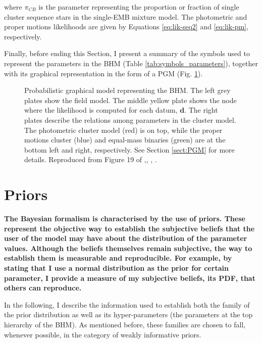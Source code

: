 where $\pi_{CB}$ is the parameter representing the proportion or fraction of single cluster sequence stars in the single-EMB mixture model. The photometric and proper motions likelihoods are given by Equations \ref{eq:lik-seq2} and \ref{eq:lik-pm}, respectively.

Finally, before ending this Section, I present a summary of the symbols used to represent the parameters in the BHM (Table \ref{tab:symbols_parameters}), together with its graphical representation in the form of a PGM (Fig. \ref{fig:PGMBHM}).



\begin{figure}[ht!]
  \begin{center}
  \resizebox{\textwidth}{!}{}
  \end{center}
  \caption{Probabilistic graphical model representing the BHM. The left grey plates show the field model. The middle yellow plate shows the node where the likelihood is computed for each datum, $\boldsymbol{d}$. The right plates describe the relations among parameters in the cluster model. The photometric cluster model (red) is on top, while the proper motions cluster (blue) and equal-mass binaries (green) are at the bottom left and right, respectively. See Section \ref{sect:PGM} for more details. Reproduced from Figure 19 of \citet{Olivares2017},\textit{}, , .}
  \label{fig:PGMBHM}
\end{figure}
 
\section{Priors}
\label{sect:priors}
\textbf{The Bayesian formalism is characterised by the use of priors. These represent the objective way to establish the subjective beliefs that the user of the model may have about the distribution of the parameter values. Although the beliefs themselves remain subjective, the way to establish them is measurable and reproducible. For example, by stating that I use a normal distribution as the prior for certain parameter, I provide a measure of my subjective beliefs, its PDF, that others can reproduce.}

In the following, I describe the information used to establish both the family of the prior distribution as well as its hyper-parameters (the parameters at the top hierarchy of the BHM). As mentioned before, these families are chosen to fall, whenever possible, in the category of weakly informative priors. 


